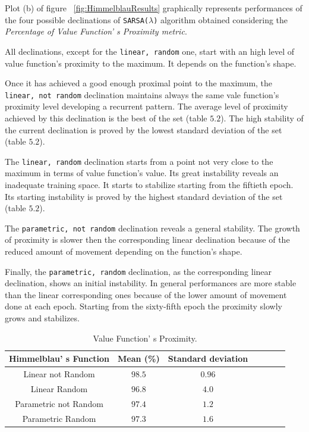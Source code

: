 Plot (b) of figure ~\ref{fig:HimmelblauResults} graphically represents performances of the four possible declinations of {\tt SARSA($\lambda$)} algorithm obtained considering the \textit{Percentage of Value Function' s Proximity metric}.

All declinations, except for the {\tt linear, random} one, start with an high level of value function's proximity to the maximum. It depends on the function's shape. 

Once it has achieved a good enough proximal point to the maximum, the {\tt linear, not random} declination maintains always the same vale function's proximity level developing a recurrent pattern. The average level of proximity achieved by this declination is the best of the set (table $5.2$). The high stability of the current declination is proved by the lowest standard deviation of the set (table $5.2$). 

The {\tt linear, random} declination starts from a point not very close to the maximum in terms of value function's value. Its great instability reveals an inadequate training space. It starts to stabilize starting from the fiftieth epoch. Its starting instability is proved by the highest standard deviation of the set (table $5.2$).

The {\tt parametric, not random} declination reveals a general stability. The growth of proximity is slower then the corresponding linear declination because of the reduced amount of movement depending on the function's shape. 

Finally, the {\tt parametric, random} declination, as the corresponding linear declination, shows an initial instability. In general performances are more stable than the linear corresponding ones because of the lower amount of movement done at each epoch. Starting from the sixty-fifth epoch the proximity slowly grows and stabilizes. \\

\begin{table} [h!]
	\centering
	\resizebox{\linewidth}{!} {
	\begin{tabular}{c| cccccc} 
		\hline \textbf{Himmelblau' s Function}
		& \textbf{Mean (\%)} & \textbf{Standard deviation}  \\ 
		\hline Linear not Random
		& \cellcolor{green!25}$98.5$ & \cellcolor{green!25}$0.96$  \\ 
		\hline Linear Random
		& $96.8$ & $4.0$ \\ 
		\hline Parametric not Random
		& $97.4$ & $1.2$ \\ 
		\hline Parametric Random
		& $97.3$ & $1.6$ \\ 
		\hline 
	\end{tabular}
}
\label{HimmelblauTabProximity}
\caption{Value Function' s Proximity.} 
\end{table}

